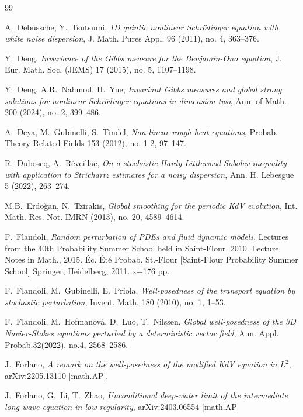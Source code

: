 \documentclass[letterpaper, 11pt,  reqno]{amsart}
\newcommand{\1}{\hspace{0.5mm}\text{I}\hspace{0.5mm}}
\numberwithin{equation}{section}
\numberwithin{theorem}{section}
\begin{document}
\begin{thebibliography}{99}
 

A.~Debussche, Y.~Tsutsumi, 
{\it 1D quintic nonlinear Schr\"odinger equation with white noise dispersion},
 J. Math. Pures Appl.  96 (2011), no. 4, 363--376. 


Y.~Deng,
{\it Invariance of the Gibbs measure for the Benjamin-Ono equation}, 
J. Eur. Math. Soc. (JEMS) 17 (2015), no. 5, 1107--1198.



Y.~Deng, A.R.~Nahmod, H.~Yue,
{\it Invariant Gibbs measures and global strong solutions for nonlinear Schr\"odinger equations in dimension two},
Ann. of Math.  200 (2024), no. 2, 399--486.

 
A.~Deya, M.~Gubinelli, S.~Tindel,
{\it Non-linear rough heat equations},
Probab. Theory Related Fields 153 (2012), no. 1-2, 97--147.
 
 

R.~Duboscq, A.~R\'eveillac, 
{\it On a stochastic Hardy-Littlewood-Sobolev inequality with application to Strichartz estimates for a noisy dispersion}, 
Ann. H. Lebesgue 5 (2022), 263--274. 


M.B.~Erdo\u{g}an, N.~Tzirakis, 
{\it Global smoothing for the periodic KdV evolution}, 
Int. Math. Res. Not. IMRN (2013), no. 20, 4589--4614.



F.~Flandoli, 
{\it Random perturbation of PDEs and fluid dynamic models},
 Lectures from the 40th Probability Summer School held in Saint-Flour, 2010. Lecture Notes in Math., 2015. 
 \'Ec. \'Et\'e Probab. St.-Flour [Saint-Flour Probability Summer School] Springer, Heidelberg, 2011. x+176 pp.




F.~Flandoli, M.~Gubinelli, E.~Priola,
{\it Well-posedness of the transport equation by stochastic perturbation},
Invent. Math. 180 (2010), no. 1, 1--53.


F.~Flandoli, M.~Hofmanov\'a, D.~Luo, T.~Nilssen, 
{\it Global well-posedness of the 3D Navier-Stokes equations perturbed by a deterministic vector field}, 
Ann. Appl. Probab.32(2022), no.4, 2568--2586.


J.~Forlano,
{\it A remark on the well-posedness of the modified KdV equation in $L^2$},
arXiv:2205.13110 [math.AP].


J.~Forlano, G.~Li, T.~Zhao,
{\it Unconditional deep-water limit of the intermediate long wave equation in low-regularity},
arXiv:2403.06554 [math.AP]




\end{thebibliography}
\end{document}
